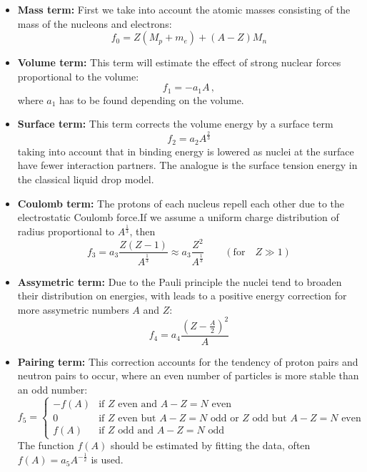 \begin{itemize}
    \item \textbf{Mass term:} 
First we take into account the atomic masses 
consisting of the mass of the nucleons and electrons:
\begin{equation}
    f_0 = Z(M_p + m_e) + (A-Z)M_n
\end{equation}
    \item \textbf{Volume term:} This term will estimate the effect of strong 
        nuclear forces proportional to the volume:
        \begin{equation}
            f_1 = -a_1 A\, ,
        \end{equation}
        where $a_1$ has to be found depending on the volume. 
    \item \textbf{Surface term:} 
        This term corrects the volume energy by a surface term
        \begin{equation}
            f_2 = a_2 A^{\frac{2}{3}} 
        \end{equation}
        taking into account that in binding energy is lowered as nuclei at the surface 
        have fewer interaction partners. The analogue is the surface tension energy 
        in the classical liquid drop model.
    \item \textbf{Coulomb term:} The protons of each nucleus repell each other due to the 
        electrostatic Coulomb force.If we assume a uniform charge distribution of 
        radius proportional to $A^{\frac{1}{3}}$, then
        \begin{equation}
            f_3 = a_3 \frac{Z(Z-1)}{A^{\frac{1}{3}}} \approx a_3 \frac{Z^2}{A^{\frac{1}{3}}} 
            \qquad (\text{for} \quad Z \gg 1)
        \end{equation}
    \item \textbf{Assymetric term:} Due to the Pauli principle the nuclei tend to broaden their distribution
        on energies, with leads to a positive energy correction for more assymetric numbers $A$ and $Z$:
        \begin{equation}
            f_4 = a_4 \frac{(Z- \frac{A}{2})^2}{A}
        \end{equation}
    \item \textbf{Pairing term:} This correction accounts for the tendency of proton pairs and neutron pairs
        to occur, where an even number of particles is more stable than an odd number:
      \begin{equation}
          f_5   =
          \begin{cases}
              -f(A) & \text{if $Z$ even and $A-Z=N$ even}\\
              0     & \text{if $Z$ even but $A-Z=N$ odd or $Z$ odd but $A-Z=N$ even}\\
              f(A)  & \text{if $Z$ odd and $A-Z=N$ odd}
          \end{cases}
          \label{eq:pair}
      \end{equation}
      The function $f(A)$ should be estimated by fitting the data, 
      often $f(A) = a_5 A^{-\frac{1}{2}}$ is used.
\end{itemize}

